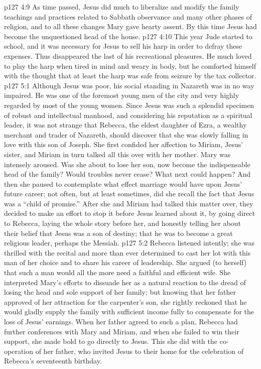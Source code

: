 \pc \vs p127 4:9 As time passed, Jesus did much to liberalize and modify the family teachings and practices related to Sabbath observance and many other phases of religion, and to all these changes Mary gave hearty assent. By this time Jesus had become the unquestioned head of the house.
\vs p127 4:10 This year Jude started to school, and it was necessary for Jesus to sell his harp in order to defray these expenses. Thus disappeared the last of his recreational pleasures. He much loved to play the harp when tired in mind and weary in body, but he comforted himself with the thought that at least the harp was safe from seizure by the tax collector.
\vs p127 5:1 Although Jesus was poor, his social standing in Nazareth was in no way impaired. He was one of the foremost young men of the city and very highly regarded by most of the young women. Since Jesus was such a splendid specimen of robust and intellectual manhood, and considering his reputation as a spiritual leader, it was not strange that Rebecca, the eldest daughter of Ezra, a wealthy merchant and trader of Nazareth, should discover that she was slowly falling in love with this son of Joseph. She first confided her affection to Miriam, Jesus’ sister, and Miriam in turn talked all this over with her mother. Mary was intensely aroused. Was she about to lose her son, now become the indispensable head of the family? Would troubles never cease? What next could happen? And then she paused to contemplate what effect marriage would have upon Jesus’ future career; not often, but at least sometimes, did she recall the fact that Jesus was a “child of promise.” After she and Miriam had talked this matter over, they decided to make an effort to stop it before Jesus learned about it, by going direct to Rebecca, laying the whole story before her, and honestly telling her about their belief that Jesus was a son of destiny; that he was to become a great religious leader, perhaps the Messiah.
\vs p127 5:2 Rebecca listened intently; she was thrilled with the recital and more than ever determined to cast her lot with this man of her choice and to share his career of leadership. She argued (to herself) that such a man would all the more need a faithful and efficient wife. She interpreted Mary’s efforts to dissuade her as a natural reaction to the dread of losing the head and sole support of her family; but knowing that her father approved of her attraction for the carpenter’s son, she rightly reckoned that he would gladly supply the family with sufficient income fully to compensate for the loss of Jesus’ earnings. When her father agreed to such a plan, Rebecca had further conferences with Mary and Miriam, and when she failed to win their support, she made bold to go directly to Jesus. This she did with the co\hyp{}operation of her father, who invited Jesus to their home for the celebration of Rebecca’s seventeenth birthday.
